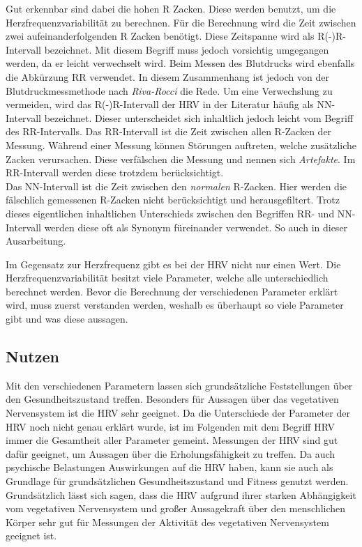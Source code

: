 Gut erkennbar sind dabei die hohen R Zacken. Diese werden benutzt, um die Herzfrequenzvariabilität zu berechnen.
Für die Berechnung wird die Zeit zwischen zwei aufeinanderfolgenden R Zacken benötigt. Diese Zeitspanne wird als R(-)R-Intervall bezeichnet. Mit diesem Begriff muss jedoch vorsichtig umgegangen werden, da er leicht verwechselt wird. Beim Messen des Blutdrucks wird ebenfalls die Abkürzung RR verwendet. In diesem Zusammenhang ist jedoch von der Blutdruckmessmethode nach \textit{Riva-Rocci} die Rede. Um eine Verwechslung zu vermeiden, wird das R(-)R-Intervall der \acs{HRV} in der Literatur häufig als NN-Intervall bezeichnet. Dieser unterscheidet sich inhaltlich jedoch leicht vom Begriff des RR-Intervalls. 
Das RR-Intervall ist die Zeit zwischen allen R-Zacken der Messung. Während einer Messung können Störungen auftreten, welche zusätzliche \glqq Zacken\grqq{} verursachen. Diese verfälschen die Messung und nennen sich \textit{Artefakte}\cite{artefakt}. Im RR-Intervall werden diese trotzdem berücksichtigt.\\
Das NN-Intervall ist die Zeit zwischen den \textit{normalen} R-Zacken. Hier werden die fälschlich gemessenen R-Zacken nicht berücksichtigt und herausgefiltert. Trotz dieses eigentlichen inhaltlichen Unterschieds zwischen den Begriffen RR- und NN-Intervall werden diese oft als Synonym füreinander verwendet. So auch in dieser Ausarbeitung.\cite{rr}\cite{kubios}


Im Gegensatz zur Herzfrequenz gibt es bei der \acs{HRV} nicht nur einen Wert. Die Herzfrequenzvariabilität besitzt viele Parameter, welche alle unterschiedlich berechnet werden. Bevor die Berechnung der verschiedenen Parameter erklärt wird, muss zuerst verstanden werden, weshalb es überhaupt so viele Parameter gibt und was diese aussagen.

\subsection{Nutzen}
Mit den verschiedenen Parametern lassen sich grundsätzliche Feststellungen über den Gesundheitszustand treffen. Besonders für Aussagen über das vegetativen Nervensystem ist die \acs{HRV} sehr geeignet. Da die Unterschiede der Parameter der \acs{HRV} noch nicht genau erklärt wurde, ist im Folgenden mit dem Begriff \acs{HRV} immer die Gesamtheit aller Parameter gemeint. Messungen der \acs{HRV} sind gut dafür geeignet, um Aussagen über die Erholungsfähigkeit zu treffen. Da auch psychische Belastungen Auswirkungen auf die \acs{HRV} haben, kann sie auch als Grundlage für grundsätzlichen Gesundheitszustand und Fitness genutzt werden. \\
Grundsätzlich lässt sich sagen, dass die \acs{HRV} aufgrund ihrer starken Abhängigkeit vom vegetativen Nervensystem und großer Aussagekraft über den menschlichen Körper sehr gut für Messungen der Aktivität des vegetativen Nervensystem geeignet ist. 
 

